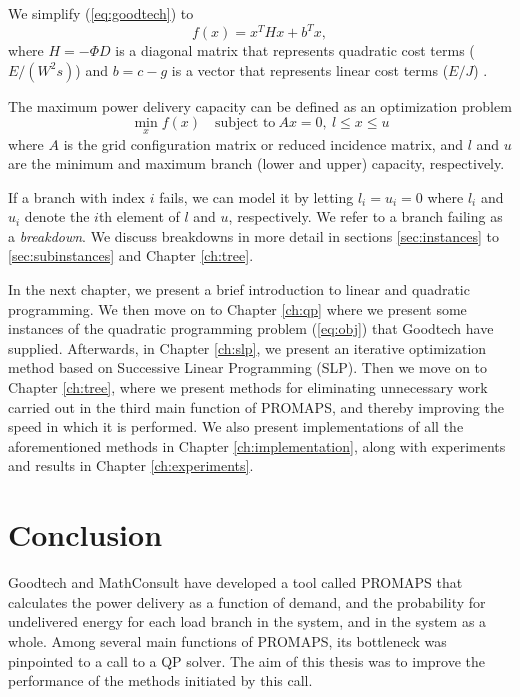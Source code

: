 \documentclass[a4paper,12pt]{report}
\begin{document}
We simplify (\ref{eq:goodtech}) to
\begin{equation}
    f(x) = x^T H x + b^T x, \label{eq:obj}
\end{equation}
where $H = - \Phi D$ is a diagonal matrix that represents quadratic cost terms
($E/(W^2 s)$) and $b = c - g$ is a vector that represents linear cost terms
($E/J$) \cite{digernes}.

The maximum power delivery capacity can be defined as an optimization problem
\begin{equation}
   \min_{x} f(x)\quad\textrm{subject to}~Ax = 0,
                             ~l \leq x \leq u \label{eq:thesisqp}
\end{equation}
where $A$ is the grid configuration matrix or reduced incidence matrix, and
$l$ and $u$ are the minimum and maximum branch (lower and upper) capacity,
respectively\cite{digernes}.

If a branch with index $i$ fails, we can model it by letting
$l_i = u_i = 0$ where $l_i$ and $u_i$ denote the $i$th element of $l$ and
$u$, respectively. We refer to a branch failing as a \textit{breakdown}.
We discuss breakdowns in more detail in sections \ref{sec:instances} to
\ref{sec:subinstances} and Chapter \ref{ch:tree}.

In the next chapter, we present a brief introduction to linear and quadratic
programming.
We then move on to Chapter \ref{ch:qp} where we present some instances of the
quadratic programming problem (\ref{eq:obj}) that Goodtech have supplied.
Afterwards, in Chapter \ref{ch:slp}, we present
an iterative optimization method based on Successive Linear Programming (SLP).
Then we move on to Chapter \ref{ch:tree}, where we present methods for
eliminating unnecessary work carried out in the third main function of PROMAPS,
and thereby improving the speed in which it is performed.
We also present implementations of all the aforementioned methods in Chapter
\ref{ch:implementation}, along with
experiments and results in Chapter \ref{ch:experiments}.








\chapter{Conclusion}
Goodtech and MathConsult have developed a tool called PROMAPS that calculates
the power delivery as a function of demand, and the probability for undelivered
energy for each load branch in the system, and in the system as a whole.
Among several main functions of PROMAPS, its bottleneck was pinpointed to
a call to a QP solver. The aim of this thesis was to improve the performance
of the methods initiated by this call.
\end{document}
